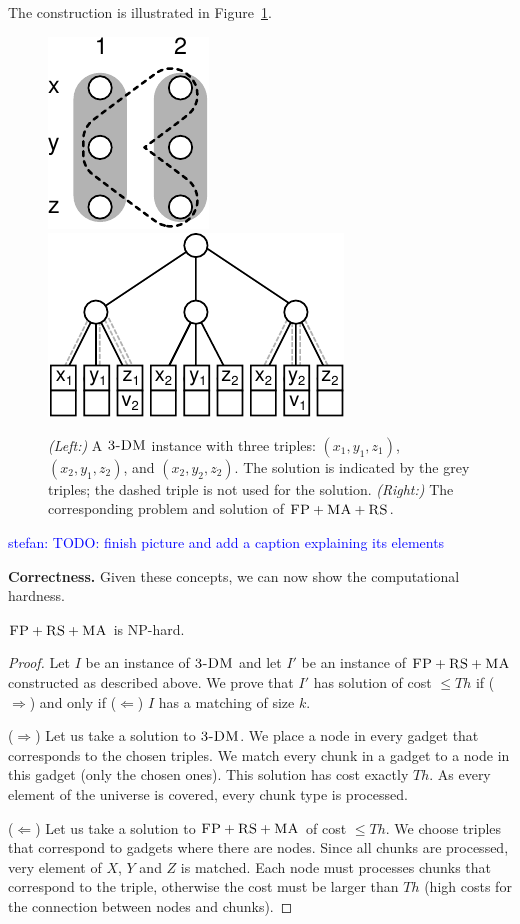 \documentclass[9pt,twocolumn]{scrartcl}
\newcommand{\stefan}[1]{\textcolor{blue}{stefan: #1}}
\newcommand{\FP}{\textsc{FP}}
\newcommand{\RS}{\textsc{RS}}
\newcommand{\MA}{\textsc{MA}}
\newcommand{\TDM}{\textsc{3-DM}}
\newcommand{\Thr}{\ensuremath{Th}}
\begin{document}
The construction is illustrated in Figure~\ref{fig:fprsma}.
\begin{figure}[htbp]
\includegraphics[width = 0.3\columnwidth]{figs/np_3dm_formular}
\hfill
\includegraphics[width = 0.6\columnwidth]{figs/np_3dm_construction}
\caption{\textit{(Left:)} A $\TDM$ instance with three triples:
$(x_1, y_1, z_1)$, $(x_2, y_1, z_2)$, and $(x_2, y_2, z_2)$. The solution is
indicated by the grey triples; the dashed triple is not used for the
solution. \textit{(Right:)} The corresponding problem and solution of $\FP + \MA
+ \RS$.}
\label{fig:fprsma}
\end{figure}
\stefan{TODO: finish picture and add a caption explaining its
elements}


\textbf{Correctness.}
Given these concepts, we can now show the computational hardness.
\begin{theorem}
$\FP+\RS+\MA$ is NP-hard.
\end{theorem}
\begin{proof}
Let $I$ be an instance of $\TDM$ and let $I'$ be an instance of
$\FP+\RS+\MA$ constructed as described above.
We prove that $I'$ has solution of cost $\leq \Thr$ if ($\Rightarrow$) and only if
($\Leftarrow$)
$I$ has a matching of size $k$.

($\Rightarrow$) Let us take a solution to $\TDM$. We place a node in every
gadget that corresponds to the chosen triples. We match every chunk in a
gadget to a node in this gadget (only the chosen ones). This solution has
cost exactly $\Thr$. As every element of the universe is covered, every
chunk type is processed.

($\Leftarrow$) Let us take a solution to $\FP+\RS+\MA$ of cost $\leq \Thr$. We
choose triples that correspond to gadgets where there are nodes. Since
all chunks are processed, very element of $X$, $Y$ and $Z$ is matched. Each
node must processes chunks that correspond to the triple, otherwise the
cost must be larger than $\Thr$ (high costs for the connection between
nodes and chunks).
\end{proof}
\end{document}
